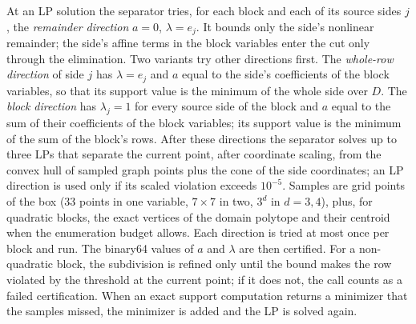 At an LP solution the separator tries, for each block and each of its source
sides $j$, the \emph{remainder direction} $a=0$, $\lambda=e_j$. It bounds only
the side's nonlinear remainder; the side's affine terms in the block variables
enter the cut only through the elimination. Two variants try other directions
first. The \emph{whole-row direction} of side $j$ has $\lambda=e_j$ and $a$
equal to the side's coefficients of the block variables, so that its support
value is the minimum of the whole side over $D$. The \emph{block direction}
has $\lambda_j=1$ for every source side of the block and $a$ equal to the sum
of their coefficients of the block variables; its support value is the minimum
of the sum of the block's rows. After these directions the separator solves up
to three LPs that separate the current point, after coordinate scaling, from
the convex hull of sampled graph points plus the cone of the side coordinates;
an LP direction is used only if its scaled violation exceeds $10^{-5}$.
Samples are grid points of the box (33 points in one variable, $7\times7$ in
two, $3^d$ in $d=3,4$), plus, for quadratic blocks, the exact vertices of the
domain polytope and their centroid when the enumeration budget allows. Each
direction is tried at most once per block and run. The binary64 values of $a$
and $\lambda$ are then certified. For a non-quadratic block, the subdivision is
refined only until the bound makes the row violated by the threshold at the
current point; if it does not, the call counts as a failed certification. When
an exact support computation returns a minimizer that the samples missed, the
minimizer is added and the LP is solved again.

